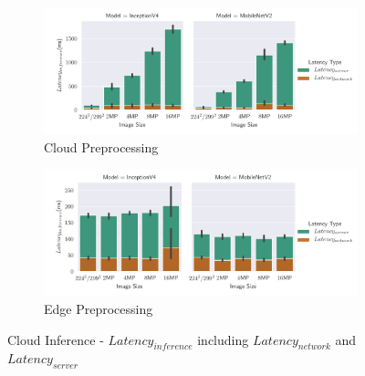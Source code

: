 \begin{figure}[H]
\centering
\begin{subfigure}[b]{0.95\textwidth}
   \includegraphics[width=1\linewidth]{./Bilder/single_plots/cloud_inference_plots/Cloud_Server_+_NetworkLatencies_cloudprepro.pdf}
   \caption{Cloud Preprocessing}
   \label{fig:CloudInferenceratioCloudtotal} 
\end{subfigure}

\begin{subfigure}[b]{0.95\textwidth}
   \includegraphics[width=1\linewidth]{./Bilder/single_plots/cloud_inference_plots/Cloud_Server_+_NetworkLatencies_edgeprepro.pdf}
   \caption{Edge Preprocessing}
   \label{fig:CloudInferenceRatioEdgetotal}
\end{subfigure}

\caption{Cloud Inference -  $Latency_{inference}$ including $Latency_{network}$ and $Latency_{server}$}
\end{figure}

